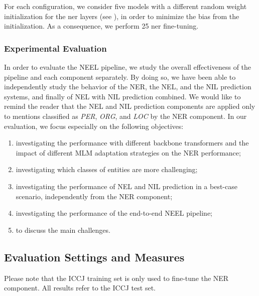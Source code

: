 For each configuration, we consider five models with a different random weight initialization for the \ac{ner} layers (see ), in order to minimize the bias from the initialization. As a consequence, we perform 25 \ac{ner} fine-tuning.


\subsubsection{Experimental Evaluation} \label{sez:experiments}

In order to evaluate the NEEL pipeline, we study the overall effectiveness of the pipeline and each component separately. By doing so, we have been able to independently study the behavior of the NER, the NEL, and the NIL prediction systems, and finally of NEL with NIL prediction combined. We would like to remind the reader that the NEL and NIL prediction components are applied only to mentions classified as \textit{PER}, \textit{ORG}, and \textit{LOC} by the NER component. In our evaluation, we focus especially on the following objectives:
\begin{enumerate}
    \item investigating the performance with different backbone transformers and the impact of different MLM adaptation strategies on the NER performance;
    \item investigating which classes of entities are more challenging;
    \item investigating the performance of NEL and NIL prediction in a best-case scenario, independently from the NER component;
    \item investigating the performance of the end-to-end NEEL pipeline;
    \item to discuss the main challenges.
\end{enumerate}

\subsection{Evaluation Settings and Measures}

Please note that the ICCJ training set is only used to fine-tune the NER component. All results refer to the ICCJ test set. 

